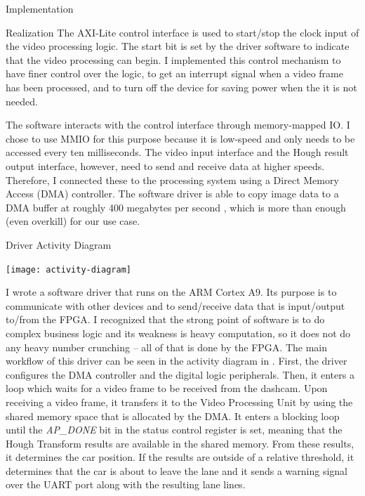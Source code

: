 \documentclass{matthijs}
\begin{document}
\begin{hoofdstuk}{Implementation}
\begin{paragraaf}{Realization}
			The AXI-Lite control interface is used to start/stop the clock input of the video processing logic.
			The start bit is set by the driver software to indicate that the video processing can begin.
			I implemented this control mechanism to have finer control over the logic, to get an interrupt signal when a video frame has been processed, and to turn off the device for saving power when the it is not needed.
			
			\noindent The software interacts with the control interface through memory-mapped IO.
			I chose to use MMIO for this purpose because it is low-speed and only needs to be accessed every ten milliseconds.
			The video input interface and the Hough result output interface, however, need to send and receive data at higher speeds.
			Therefore, I connected these to the processing system using a Direct Memory Access (DMA) controller.
			The software driver is able to copy image data to a DMA buffer at roughly 400 megabytes per second \cite{xilinx2022dma}, which is more than enough (even overkill) for our use case.

			\begin{figuur}{Driver Activity Diagram}
				\singlespacing
				\centerline{
					\texttt{[image: activity-diagram]} 
				}
				\onehalfspacing
			\end{figuur}

			\noindent I wrote a software driver that runs on the ARM Cortex A9.
			Its purpose is to communicate with other devices and to send/receive data that is input/output to/from the FPGA.
			I recognized that the strong point of software is to do complex business logic and its weakness is heavy computation, so it does not do any heavy number crunching -- all of that is done by the FPGA.
			The main workflow of this driver can be seen in the activity diagram in .
			First, the driver configures the DMA controller and the digital logic peripherals.
			Then, it enters a loop which waits for a video frame to be received from the dashcam.
			Upon receiving a video frame, it transfers it to the Video Processing Unit by using the shared memory space that is allocated by the DMA.
			It enters a blocking loop until the \textit{AP\_DONE} bit in the status control register is set, meaning that the Hough Transform results are available in the shared memory.
			From these results, it determines the car position.
			If the results are outside of a relative threshold, it determines that the car is about to leave the lane and it sends a warning signal over the UART port along with the resulting lane lines.


\end{paragraaf}
\end{hoofdstuk}
\end{document}
